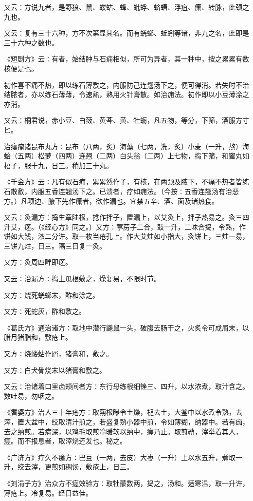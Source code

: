 \documentclass[a4paper,12pt,UTF8,twoside]{ctexbook}
\begin{document}
又云∶方说九者，是野狼、鼠、蝼蛄、蜂、蚍蜉、蛴螬、浮疽、瘰、转脉，此颈之九也。

又云∶复有三十六种，方不次第显其名。而有蜣螂、蚯蚓等诸，非九之名，此即是三十六种之数也。

《短剧方》云∶有者，始结肿与石痈相似，所可为异者，其一种中，按之累累有数核便是也。

初作喜不痛不热，即以练石薄敷之，内服防己连翘汤下之，便可得消。若失时不治结脓者，亦以练石薄薄，令速熟，熟用火针膏散。如治痈法。初作即以小豆薄涂之亦消。

又云∶桐君说，赤小豆、白蔹、黄芩、黄、牡蛎，凡五物，等分，下筛，酒服方寸匕。

治瘿瘤诸昆布丸方∶昆布（八两，炙）海藻（七两，洗，炙）小麦（一升，熬）海蛤（五两）松萝（四两）连翘（二两）白头翁（二两）上七物，捣下筛，和蜜丸如梧子，服十九，日三。稍加三十丸。

《千金方》云∶凡有似石痈，累累然作子，有核，在两颈及腋下，不痛不热者皆练石散敷，内服五香连翘汤下之。已溃者，疗如痈法。（今按∶五香连翘汤有治恶方。）凡项边、腋下先作瘰者，欲作漏也。宜禁五辛、酒、面及诸热食。

又云∶灸漏方∶捣生章陆根，捻作拌子，置漏上，以艾灸上，拌子热易之。灸三四升艾，瘥。（《经心方》同之。）又方∶葶苈子二合，豉一升，二味合捣，令熟，作饼如大钱，浓二分许。取一枚当疮孔上。作大艾炷如小指大，灸饼上，三炷一易，三饼九炷，日三。隔三日复一灸。

又方∶灸周四畔即瘥。

又云∶治漏方∶捣土瓜根敷之，燥复易，不限时节。

又方∶烧死蜣螂末，酢和涂之。

又方∶死蛇灰，酢和敷之。

《葛氏方》通治诸方∶取地中潜行鼷鼠一头，破腹去肠干之，火炙令可成屑末，以腊月猪脂和，敷疮上。

又方∶烧蝼蛄作屑，猪膏和，敷之。

又方∶白犬骨烧末以猪膏和敷之。

又云∶治诸着口里齿颊间者方∶东行母练根细锉三、四升，以水浓煮，取汁含之。数吐易，勿咽之。

《耆婆方》治人三十年疮方∶取蒴根曝令土燥，槌去土，大釜中以水煮令熟，去滓，置大盆中，绞取清汁煎之，若盛复熟小器中煎，令如薄糊，纳器中。若有痂，去之纳煎。若病深，以鸡毛取煎冷暖软以纳中，瘥乃止。取煎蒴，滓举着其人，瘥。而不报息者，取滓烧还发也。秘之。

《广济方》疗久不瘥方∶巴豆（一两，去皮）大枣（一升）上以水五升，煮取一升，绞去滓，更煎如稠饧，敷疮上，日三。

《刘涓子方》治众方不瘥效验方∶取牡蒙数两，捣之，汤和。适寒温，取一升许，薄疮上。冷复易。经日益佳。
\end{document}
